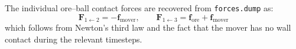 \documentclass{article}
\begin{document}
\noindent The individual ore–ball contact forces are recovered from \texttt{forces.dump} as:
\begin{equation}
    \mathbf{F}_{1\leftarrow 2} = -\mathbf{f}_{\text{mover}}, \qquad
    \mathbf{F}_{1\leftarrow 3} = \mathbf{f}_{\text{ore}} + \mathbf{f}_{\text{mover}}
\end{equation}
which follows from Newton's third law and the fact that the mover has no wall contact
during the relevant timesteps.
\end{document}
